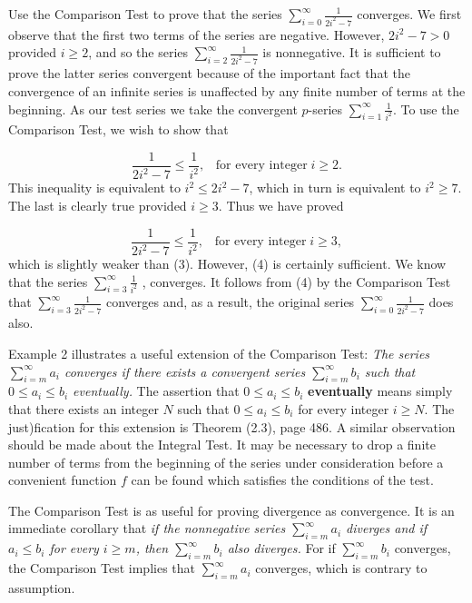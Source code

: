 \begin{example} Use the Comparison Test to prove that the series $\sum_{i=0}^\infty \frac{1}{2i^2 - 7}$ converges. We first observe that the first two terms of the series are negative. However, $2i^2 - 7 > 0$ provided $i \geq 2$, and so the series $\sum_{i=2}^\infty \frac{1}{2i^2 - 7}$ is nonnegative. It is sufficient to prove the latter series convergent because of the important fact that the convergence of an infinite series is unaffected by any finite number of terms at the beginning. As our test series we take the convergent $p$-series $\sum_{i=1}^\infty \frac{1}{i^2}$. To use the Comparison Test, we wish to show that

\begin{equation}
\frac{1}{2i^2 - 7} \leq \frac{1}{i^2}, \;\;\;\mbox{for every integer}\; i \geq 2.  
\label{eq9.3.3}
\end{equation}
\noindent This inequality is equivalent to $i^2 \leq 2i^2 - 7$, which in turn is equivalent to $i^2 \geq 7$. The last is clearly true provided $i \geq 3$. Thus we have proved

\begin{equation}
\frac{1}{2i^2 - 7} \leq \frac{1}{i^2}, \;\;\;\mbox{for every integer}\; i \geq 3,  
\label{eq9.3.4}
\end{equation}
\noindent which is slightly weaker than (3). However, (4) is certainly sufficient. We know that the series $\sum_{i=3}^\infty \frac{1}{i^2}$ , converges. It follows from (4) by the Comparison Test that $\sum_{i=3}^\infty \frac{1}{2i^2 - 7}$ converges and, as a result, the original series $\sum_{i=0}^\infty \frac{1}{2i^2 - 7}$ does also.
\end{example}

Example 2 illustrates a useful extension of the Comparison Test: \textit{The series $\sum_{i=m}^\infty a_i$ converges if there exists a convergent series $\sum_{i=m}^\infty b_i$ such that $0 \leq a_i \leq b_i$ eventually.} The assertion that $0 \leq a_i \leq b_i$ \textbf{eventually} means simply that there exists an integer $N$ such that $0 \leq a_i \leq b_i$ for every integer $i \geq N$. The just)fication for this extension is Theorem (2.3), page 486. A similar observation should be made about the Integral Test. It may be necessary to drop a finite number of terms from the beginning of the series under consideration before a convenient function $f$ can be found which satisfies the conditions of the test.

The Comparison Test is as useful for proving divergence as convergence. It is an immediate corollary that \textit{if the nonnegative series $\sum_{i=m}^\infty a_i$ diverges and if $a_i \leq b_i$ for every $i \geq m$, then $\sum_{i=m}^\infty b_i$ also diverges.}  For if $\sum_{i=m}^\infty b_i$ converges, the Comparison Test implies that $\sum_{i=m}^\infty a_i$ converges, which is contrary to assumption.

